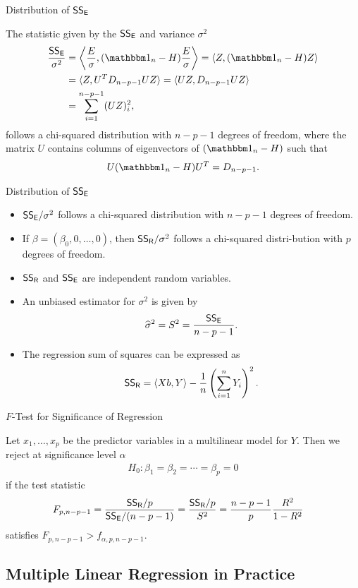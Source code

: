 \begin{frame}{Distribution of $\mathsf{SS_E}$}

\justifying
{} The statistic given by the $\mathsf{SS_E}$ and variance $\sigma^2$
\begin{align*}
\frac{\U{SS_E}}{\sigma^2} & = \left\langle \frac{E}{\sigma}, (\bbone_n - H)\frac{E}{\sigma}\right\rangle = \langle Z, (\bbone_n - H)Z\rangle \\
& = \langle Z, U^TD_{n-p-1}UZ\rangle = \langle UZ, D_{n-p-1}UZ\rangle \\
& = \sum_{i=1}^{n-p-1} (UZ)_i^2,
\end{align*}
follows a chi-squared distribution with $n-p-1$ degrees of freedom, where the matrix $U$ contains columns of eigenvectors of $(\bbone_n-H)$ such that
\begin{align*}
U(\bbone_n-H)U^T = D_{n-p-1}.
\end{align*}

\end{frame}

\begin{frame}{Distribution of $\mathsf{SS_E}$}

\begin{itemize}
	\justifying
	\item $\mathsf{SS_E}/\sigma^2$ follows a chi-squared distribution with $n-p-1$ degrees of freedom.
	\item If $\beta = (\beta_0, 0, \ldots, 0)$, then $\mathsf{SS_R}/\sigma^2$ follows a chi-squared distri-bution with $p$ degrees of freedom.
	\item $\mathsf{SS_R}$ and $\mathsf{SS_E}$ are independent random variables.
	\item An unbiased estimator for $\sigma^2$ is given by
	\begin{align*}
	\widehat{\sigma}^2 = S^2 = \frac{\mathsf{SS_E}}{n-p-1}.
	\end{align*}
	\item The regression sum of squares can be expressed as
	\begin{align*}
	\mathsf{SS_R} = \langle Xb, Y\rangle - \frac{1}{n}\left(\sum_{i=1}^n Y_i \right)^2.
	\end{align*}
\end{itemize}

\end{frame}

\begin{frame}{$F$-Test for Significance of Regression}

\justifying
{} Let $x_1, \ldots, x_p$ be the predictor variables in a multilinear model for $Y$. Then we reject at significance level $\alpha$
\begin{align*}
H_0: \beta_1 = \beta_2 = \cdots = \beta_p = 0
\end{align*}
if the test statistic
\begin{align*}
F_{p,n-p-1} & = \frac{\mathsf{SS_R}/p}{\mathsf{SS_E}/(n-p-1)} = \frac{\mathsf{SS_R}/p}{S^2} = \frac{n-p-1}{p}\frac{R^2}{1-R^2}
\end{align*}
satisfies $F_{p,n-p-1} > f_{\alpha,p,n-p-1}$.

\end{frame}

\subsection{Multiple Linear Regression in Practice}

